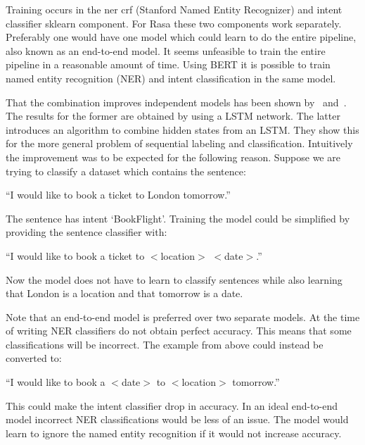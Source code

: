 Training occurs in the ner crf (Stanford Named Entity Recognizer) and intent classifier sklearn component.
For Rasa these two components work separately.
Preferably one would have one model which could learn to do the entire pipeline, also known as an end-to-end model.
It seems unfeasible to train the entire pipeline in a reasonable amount of time.
Using BERT it is possible to train named entity recognition (NER) and intent classification in the same model.

That the combination improves independent models has been shown by~\citet{ma2017jointly} and~\citet{zhang2018joint}.
The results for the former are obtained by using a LSTM network.
The latter introduces an algorithm to combine hidden states from an LSTM.
They show this for the more general problem of sequential labeling and classification.
Intuitively the improvement was to be expected for the following reason.
Suppose we are trying to classify a dataset which contains the sentence:

\begin{center}
    ``I would like to book a ticket to London tomorrow.''
\end{center}

The sentence has intent `BookFlight'.
Training the model could be simplified by providing the sentence classifier with:

\begin{center}
    ``I would like to book a ticket to $<$location$>$ $<$date$>$.''
\end{center}

Now the model does not have to learn to classify sentences while also learning that London is a location and that tomorrow is a date.

Note that an end-to-end model is preferred over two separate models.
At the time of writing NER classifiers do not obtain perfect accuracy.
This means that some classifications will be incorrect.
The example from above could instead be converted to:

\begin{center}
    ``I would like to book a $<$date$>$ to $<$location$>$ tomorrow.''
\end{center}

This could make the intent classifier drop in accuracy.
In an ideal end-to-end model incorrect NER classifications would be less of an issue.
The model would learn to ignore the named entity recognition if it would not increase accuracy.



